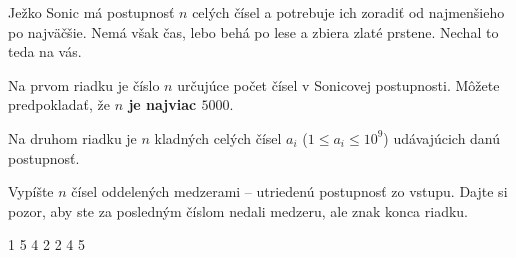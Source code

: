 




Ježko Sonic má postupnosť $n$ celých čísel a potrebuje ich zoradiť od najmenšieho po najväčšie. Nemá
však čas, lebo behá po lese a zbiera zlaté prstene. Nechal to teda na vás.


Na prvom riadku je číslo $n$ určujúce počet čísel v Sonicovej postupnosti. Môžete predpokladať, že
\textbf{$n$ je najviac $5000$}.

Na druhom riadku je $n$ kladných celých čísel $a_i$ ($1 \leq a_i \leq 10^9$) udávajúcich danú
postupnosť.


Vypíšte $n$ čísel oddelených medzerami -- utriedenú postupnosť zo vstupu. Dajte si pozor, aby ste
za posledným číslom nedali medzeru, ale znak konca riadku.


1 5 4 2
 2 4 5
\koniec


